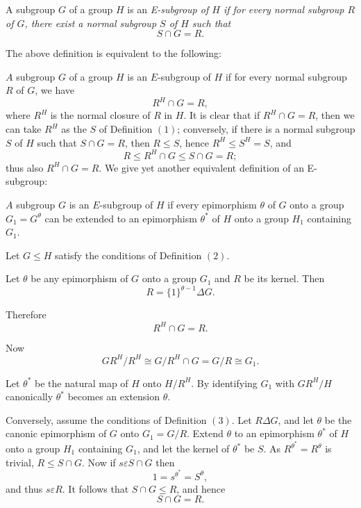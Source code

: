 \setcounter{Definition}{0}
\begin{Definition} %
  A subgroup $G$ of a group $H$ is an \em{E-subgroup} of $H$ if for
  every normal subgroup $R$ of $G$, there exist a normal subgroup $S$
  of $H$ such that  
  $$
  S \cap G=R. 
  $$
\end{Definition}

The above definition is equivalent to the following:
\begin{Definition} %
  $A$ subgroup $G$ of a group $H$ is an $E$-subgroup of $H$ if for
  every normal subgroup $R$ of $G$, we have  
  $$
  R^H \cap G=R,
  $$
  where $R^H$ is the normal closure of $R$ in $H$. It is clear that if
  $R^H \cap G=R$, then we can take $R^H$ as the $S$ of Definition
  $(1)$; conversely, if there is a normal subgroup $S$ of $H$ such
  that $S \cap G=R$, then $R \le S$, hence $R^H \le S^H =S$, and  
  $$
  R \le R^H \cap G \le S \cap G = R ;
  $$
  thus also $R^H \cap G=R$. We give yet another equivalent definition
  of an E-subgroup: 
\end{Definition} 

\begin{Definition} %
  $A$ subgroup $G$ is an $E$-subgroup of $H$ if every epimorphism
  $\theta$ of $G$ onto a group $G_1 = G^{\theta}$ can be extended to
  an epimorphism $\theta^*$ of $H$ onto a group $H_1$ containing
  $G_1$. 
\end{Definition} 
 
Let $G \le H$ satisfy the conditions of Definition $(2)$.
 
 Let $\theta$ be any epimorphism of $G$ onto a group $G_1$ and $R$ be
 its kernel. Then  
 $$
 R= \{ 1\}^{\theta -1} \Delta G.
 $$
 
 Therefore
 $$
 R^H \cap G = R.
 $$
 
 Now
 $$
 GR^H / R^H \cong G/R^H \cap G= G/R \cong G_1. 
 $$ 
 
Let $\theta^*$ be the natural map of $H$ onto $H/R^H$. By identifying
$G_1$ with $GR^H/H$ canonically $\theta^*$ becomes an extension
$\theta$. 
 
Conversely, assume the conditions of Definition $(3)$. Let $R \Delta
G$, and let $\theta$ be the canonic epimorphism of $G$ onto $G_1 =
G/R$. Extend $\theta$ to an epimorphism $\theta^*$ of  $H$ onto a
group $H_1$ containing $G_1$, and let the kernel of $\theta^*$ be
$S$. As $R^{\theta^*}= R^{\theta}$ is trivial, $R \le S \cap G$. Now
if $s \varepsilon S \cap G$ then 
$$
1=s^{\theta^*}= S^{\theta}, 
$$ 
and thus $s \varepsilon R$. It follows that $S \cap G \le R$, and hence 
$$
S \cap G =R. 
$$
 
